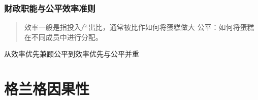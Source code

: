 \documentclass[
]{book}
\begin{document}
\hypertarget{ux8d22ux653fux804cux80fdux4e0eux516cux5e73ux6548ux7387ux51c6ux5219}{%
\subsection{财政职能与公平效率准则}\label{ux8d22ux653fux804cux80fdux4e0eux516cux5e73ux6548ux7387ux51c6ux5219}}

\begin{quote}
效率一般是指投入产出比，通常被比作如何将蛋糕做大
公平：如何将蛋糕在不同成员中进行分配。
\end{quote}

从效率优先兼顾公平到效率优先与公平并重

\hypertarget{causal}{%
\chapter{格兰格因果性}\label{causal}}

\printbibliography
\end{document}
